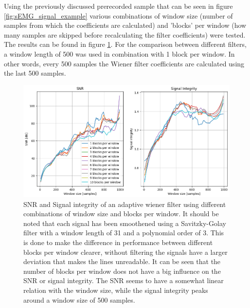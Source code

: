 Using the previously discussed prerecorded sample that can be seen in figure \ref{fig:sEMG_signal_example} various combinations of window size (number of samples from which the coefficients are calculated) and 'blocks' per window (how many samples are skipped before recalculating the filter coefficients) were tested. The results can be found in figure \ref{fig:adaptive_wiener_windowsize}. For the comparison between different filters, a window length of 500 was used in combination with 1 block per window. In other words, every 500 samples the Wiener filter coefficients are calculated using the last 500 samples.

\begin{figure}[h!t]
	\begin{center}
		\includegraphics[width=1.0\columnwidth]{images/adaptive_wiener_windowsize.png}
	\end{center}
	\caption{SNR and Signal integrity of an adaptive wiener filter using different combinations of window size and blocks per window. It should be noted that each signal has been smoothened using a Savitzky-Golay filter with a window length of 31 and a polynomial order of 3. This is done to make the difference in performance between different blocks per window clearer, without filtering the signals have a larger deviation that makes the lines unreadable.
	It can be seen that the number of blocks per window does not have a big influence on the SNR or signal integrity. The SNR seems to have a somewhat linear relation with the window size, while the signal integrity peaks around a window size of 500 samples.}
	\label{fig:adaptive_wiener_windowsize}
\end{figure}


